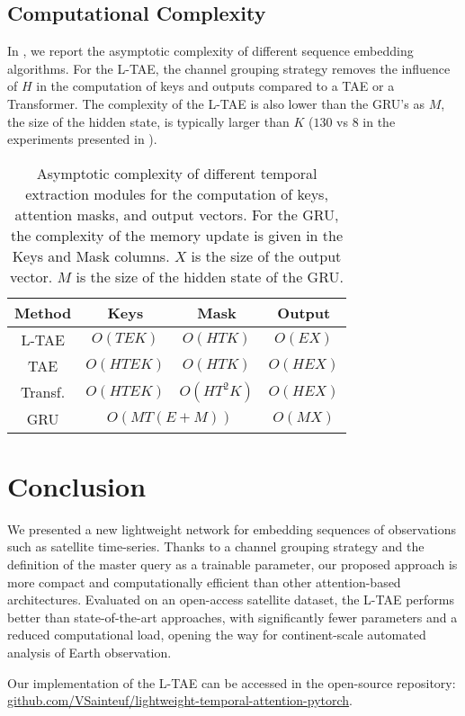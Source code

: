 \documentclass[runningheads]{llncs}
\begin{document}
\subsection{Computational Complexity}
In , we report the asymptotic complexity of different sequence embedding algorithms. For the L-TAE, the channel grouping strategy removes the influence of $H$ in the computation of keys and outputs compared to a TAE or a Transformer. The complexity of the L-TAE is also lower than the GRU's as $M$, the size of the hidden state, is typically larger than $K$ ($130$ vs $8$ in the experiments presented in ). 
\begin{table}[]
  \caption{Asymptotic complexity of different temporal extraction modules for the computation of keys, attention masks, and output vectors. For the GRU, the complexity of the memory update is given in the Keys and Mask columns. $X$ is the size of the output vector. $M$ is the size of the hidden state of the GRU.}
    \label{tab:complexity}
    \centering
\begin{tabular}{c@{\quad}c@{\quad}c@{\quad}c}
    Method & Keys &  Mask & Output \\\toprule
    L-TAE & $O(TEK)$ & $O(HTK)$&  $O(EX)$ \\
    TAE & $O(HTEK)$  & $O(HTK)$ &  $O(HEX)$ \\
    Transf. & $O(HTEK)$ & $O(HT^2K)$ & $O(HEX)$ \\
    GRU &  \multicolumn{2}{c}{$O\left(MT(E+M)\right)$} & $O(MX)$  \\\bottomrule
\end{tabular}
\end{table} \section{Conclusion}
We presented a new lightweight network for embedding sequences of observations such as satellite time-series. Thanks to a channel grouping strategy and the definition of the master query as a trainable parameter, our proposed approach is more compact and computationally efficient than other attention-based architectures.
Evaluated on an open-access satellite dataset, the L-TAE performs better than state-of-the-art approaches, with significantly fewer parameters and a reduced computational load, opening the way for continent-scale automated analysis of Earth observation.

Our implementation of the L-TAE can be accessed in the open-source repository: \url{github.com/VSainteuf/lightweight-temporal-attention-pytorch}.
\end{document}
